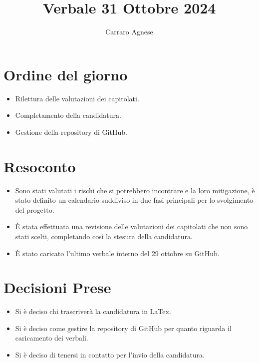 \documentclass{TWReport}
\title{Verbale 31 Ottobre 2024}
\author{Carraro Agnese}
\begin{document}
\frontmatter

\showPartecipants

\section*{Ordine del giorno}
\begin{itemize}
    \item Rilettura delle valutazioni dei capitolati.
    \item Completamento della candidatura.
    \item Gestione della repository di GitHub.
\end{itemize}

\section*{Resoconto}
\begin{itemize}
    \item Sono stati valutati i rischi che si potrebbero incontrare e la loro mitigazione, è stato definito un calendario suddiviso in due fasi principali per lo svolgimento del progetto. 
    \item È stata effettuata una revisione delle valutazioni dei capitolati che non sono stati scelti, completando così la stesura della candidatura.
    \item È stato caricato l'ultimo verbale interno del 29 ottobre su GitHub. 
\end{itemize}

\section*{Decisioni Prese}
\begin{itemize}
    \item Si è deciso chi trascriverà la candidatura in LaTex.
    \item Si è deciso come gestire la repository di GitHub per quanto riguarda il caricamento dei verbali.
    \item Si è deciso di tenersi in contatto per l'invio della candidatura.
\end{itemize}
\end{document}
